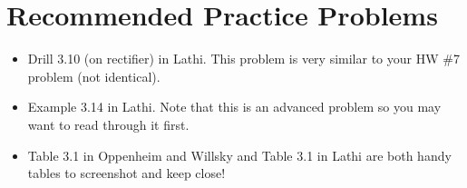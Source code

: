 \documentclass{ee102_notes}
\begin{document}
\section{Recommended Practice Problems}

\begin{itemize}
    \item Drill 3.10 (on rectifier) in Lathi. This problem is very similar to your HW \#7 problem (not identical).
    \item Example 3.14 in Lathi. Note that this is an advanced problem so you may want to read through it first.
    \item Table 3.1 in Oppenheim and Willsky and Table 3.1 in Lathi are both handy tables to screenshot and keep close!
\end{itemize}
\end{document}
